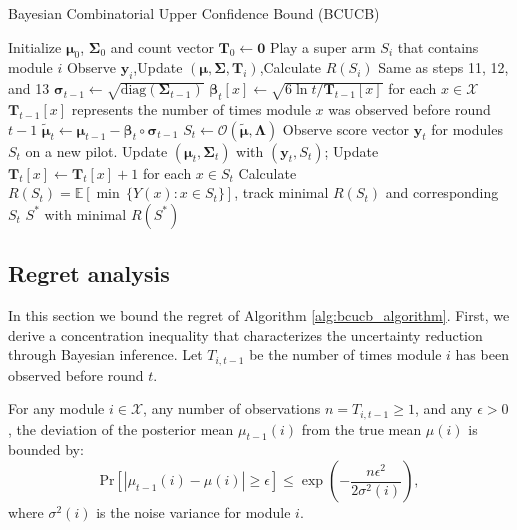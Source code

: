 \documentclass[opre,sglanonrev]{informs4}
\begin{document}
\begin{algorithm}
\caption{Bayesian Combinatorial Upper Confidence Bound (BCUCB)}
\label{alg:bcucb_algorithm}
\begin{algorithmic}[1]
\State Initialize $\boldsymbol{\mu}_0$, $\boldsymbol{\Sigma}_0$ and count vector $\mathbf{T}_0 \gets \mathbf{0}$ 
 
	\State Play a super arm $S_i$ that contains module $i$
	\State Observe $\mathbf{y}_i$,Update $(\boldsymbol{\mu}, \boldsymbol{\Sigma},\mathbf{T}_i)$,Calculate $R(S_i)$ \Comment Same as steps 11, 12, and 13
\EndFor
{} 
    \State $\boldsymbol{\sigma}_{t-1} \gets \sqrt{\text{diag}(\boldsymbol{\Sigma}_{t-1})}$ 
    \State $\boldsymbol{\beta}_t[x] \gets \sqrt{6 \ln t / \mathbf{T}_{t-1}[x]}$ for each $x \in \mathcal{X}$ \Comment $\mathbf{T}_{t-1}[x]$ represents the number of times module $x$ was observed before round $t-1$
    \State $\boldsymbol{\tilde{\mu}}_t \gets \boldsymbol{\mu}_{t-1} - \boldsymbol{\beta}_t \circ \boldsymbol{\sigma}_{t-1}$ 
    \State $S_t \gets \mathcal{O}(\boldsymbol{\tilde{\mu}}, \boldsymbol{\Lambda})$ 
    \State Observe score vector $\mathbf{y}_t$ for modules $S_t$ on a new pilot.
    \State Update $(\boldsymbol{\mu}_t, \boldsymbol{\Sigma}_t)$ with $(\mathbf{y}_t, S_t)$; Update $\mathbf{T}_t[x] \gets \mathbf{T}_t[x] + 1$ for each $x \in S_t$
    \State Calculate $R(S_t) = \mathbb{E}[\min\,\{Y(x) : x \in S_t\}]$, track minimal $R(S_t)$ and corresponding $S_t$ 
\EndFor
\State \Return $S^*$ with minimal $R(S^*)$
\end{algorithmic}
\end{algorithm}

\subsection{Regret analysis}
In this section we bound the regret of Algorithm \ref{alg:bcucb_algorithm}.
First, we derive a concentration inequality that characterizes the uncertainty reduction through Bayesian inference. Let $T_{i,t-1}$ be the number of times module $i$ has been observed before round $t$.
\begin{lemma}
\label{lemma:concentration}
For any module $i \in \mathcal{X}$, any number of observations $n = T_{i,t-1} \geq 1$, and any $\epsilon > 0$, the deviation of the posterior mean $\mu_{t-1}(i)$ from the true mean $\mu(i)$ is bounded by:
$$
\mathrm{Pr}\left[|\mu_{t-1}(i) - \mu(i)| \geq \epsilon \right] \leq \exp\left(-\frac{n \epsilon^2}{2\sigma^2(i)}\right),
$$
where $\sigma^2(i)$ is the noise variance for module $i$.
\end{lemma}
\end{document}
